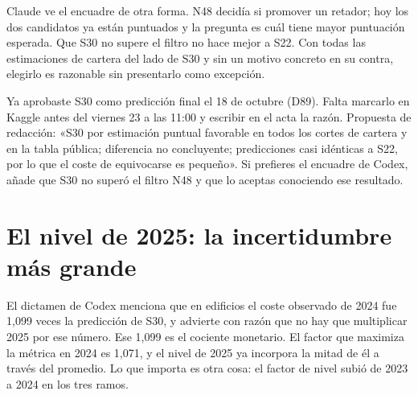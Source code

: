 \documentclass[11pt,a4paper]{article}
\begin{document}
Claude ve el encuadre de otra forma. N48 decidía si promover un retador; hoy los dos candidatos ya están puntuados y la pregunta es cuál tiene mayor puntuación esperada. Que S30 no supere el filtro no hace mejor a S22. Con todas las estimaciones de cartera del lado de S30 y sin un motivo concreto en su contra, elegirlo es razonable sin presentarlo como excepción.

\begin{pendiente}
Ya aprobaste S30 como predicción final el 18 de octubre (D89). Falta marcarlo en Kaggle antes del viernes 23 a las 11:00 y escribir en el acta la razón. Propuesta de redacción: «S30 por estimación puntual favorable en todos los cortes de cartera y en la tabla pública; diferencia no concluyente; predicciones casi idénticas a S22, por lo que el coste de equivocarse es pequeño». Si prefieres el encuadre de Codex, añade que S30 no superó el filtro N48 y que lo aceptas conociendo ese resultado.
\end{pendiente}

\section{El nivel de 2025: la incertidumbre más grande}

El dictamen de Codex menciona que en edificios el coste observado de 2024 fue 1,099 veces la predicción de S30, y advierte con razón que no hay que multiplicar 2025 por ese número. Ese 1,099 es el cociente monetario. El factor que maximiza la métrica en 2024 es 1,071, y el nivel de 2025 ya incorpora la mitad de él a través del promedio. Lo que importa es otra cosa: el factor de nivel subió de 2023 a 2024 en los tres ramos.
\end{document}
